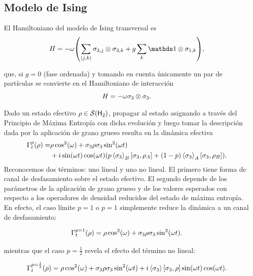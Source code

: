 \subsection{Modelo de Ising}

El Hamiltoniano del modelo de Ising transversal es
\begin{equation*}
    H=-\omega\qty(\sum_{\langle j,k \rangle}\pauli{3,j}\otimes\pauli{3,k}+g\sum_{k}\Id\otimes\pauli{1,k}),
\end{equation*}

que, si $g=0$ (fase ordenada) y tomando en cuenta únicamente un par de partículas se convierte en el Hamiltoniano de interacción
\begin{equation*}
    H=-\omega \sigma_{3}\otimes\sigma_{3}.
\end{equation*}

Dado un estado efectivo $\rho\in\mathcal{S}({\sf H}_{2})$, propagar al estado asignando a través del Principio de Máxima Entropía con dicha evolución y luego tomar la descripción dada por la aplicación de grano grueso resulta en la dinámica efectiva
\begin{align*}
    \Gamma_{t}^{p}(\rho)=&\rho \cos^{2}(\omega)+\sigma_{3} \rho \sigma_{3} \sin^{2}(\omega t)\\
    & + i\sin(\omega t)\cos(\omega t)\qty(p\expval{\sigma_{3}}_{B}[\sigma_{3},\rho_{A}]+(1-p)\expval{\sigma_{3}}_{A}[\sigma_{3},\rho_{B}]).
\end{align*}
Reconocemos dos términos: uno lineal y uno no lineal. El primero tiene forma de canal de desfasamiento sobre el estado efectivo. El segundo depende de los parámetros de la aplicación de grano grueso y de los valores esperados con respecto a los operadores de densidad reducidos del estado de máxima entropía. En efecto, el caso límite $p=1$ o $p=1$ simplemente reduce la dinámica a un canal de desfasamiento:

\begin{equation*}
    \Gamma_{t}^{p=1}(\rho)=\rho \cos^{2}(\omega)+\sigma_{3} \rho \sigma_{3} \sin^{2}(\omega t).
\end{equation*}

mientras que el caso $p=\frac{1}{2}$ revela el efecto del término no lineal:

\begin{equation*}
    \Gamma_{t}^{p=\frac{1}{2}}(\rho)=\rho \cos^{2}(\omega)+\sigma_{3} \rho \sigma_{3} \sin^{2}(\omega t) + i\expval{\sigma_{3}} \qty[\sigma_{3},\rho] \sin(\omega t)\cos(\omega t).
\end{equation*}

